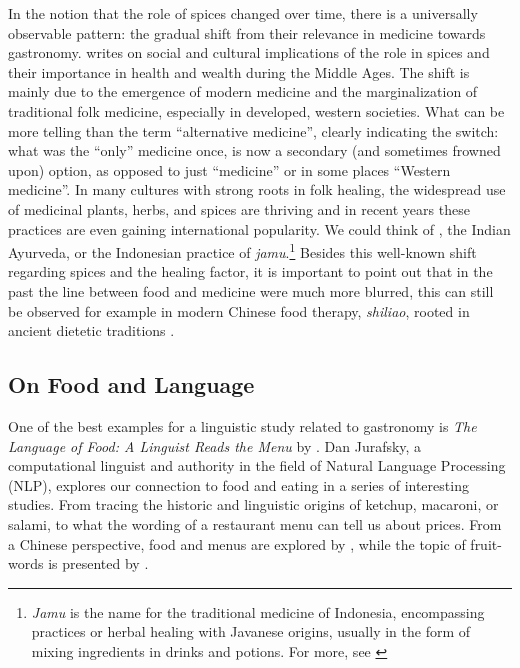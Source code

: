 In the notion that the role of spices changed over time, there is a universally observable pattern: the gradual shift from their relevance in medicine towards gastronomy. \textcite{freedman_health_2015} writes on social and cultural implications of the role in spices and their importance in health and wealth during the Middle Ages. The shift is mainly due to the emergence of modern medicine and the marginalization of traditional folk medicine, especially in developed, western societies. What can be more telling than the term ``alternative medicine'', clearly indicating the switch: what was the ``only'' medicine once, is now a secondary (and sometimes frowned upon) option, as opposed to just ``medicine'' or in some places ``Western medicine''. In many cultures with strong roots in folk healing, the widespread use of medicinal plants, herbs, and spices are thriving and in recent years these practices are even gaining international popularity. We could think of , the Indian \gls{Ayurveda}, or the Indonesian practice of \textit{jamu}.\footnote{\textit{Jamu} is the name for the traditional medicine of Indonesia, encompassing practices or herbal healing with Javanese origins, usually in the form of mixing ingredients in drinks and potions. For more, see \textcite{beers_jamu_2012}} Besides this well-known shift regarding spices and the healing factor, it is important to point out that in the past the line between food and medicine were much more blurred, this can still be observed for example in modern Chinese food therapy,  \textit{shiliao}, rooted in ancient dietetic traditions \autocite{engelhardt_dietetics_2001}.

\subsection{On Food and Language}

One of the best examples for a linguistic study related to gastronomy is \textit{The Language of Food: A Linguist Reads the Menu} by \textcite{jurafsky_language_2014}. Dan Jurafsky, a computational linguist and authority in the field of Natural Language Processing (NLP), explores our connection to food and eating in a series of interesting studies. From tracing the historic and linguistic origins of ketchup, macaroni, or salami, to what the wording of a restaurant menu can tell us about prices. From a Chinese perspective, food and menus are explored by \textcite{yao_chinese_2019}, while the topic of fruit-words is presented by \textcite{depner_chinese_2019}. 

